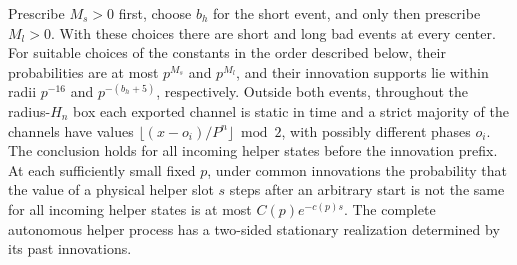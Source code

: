 \begin{lemma}\label{lem:stripes}
Prescribe \(M_s>0\) first, choose \(b_h\) for the short event, and only then prescribe \(M_l>0\). With these choices there are short and long bad events at every center. For suitable choices of the constants in the order described below, their probabilities are at most \(p^{M_s}\) and \(p^{M_l}\), and their innovation supports lie within radii \(p^{-16}\) and \(p^{-(b_h+5)}\), respectively. Outside both events, throughout the radius-\(H_n\) box each exported channel is static in time and a strict majority of the channels have values \(\lfloor(x-o_i)/P^n\rfloor\bmod2\), with possibly different phases \(o_i\). The conclusion holds for all incoming helper states before the innovation prefix. At each sufficiently small fixed \(p\), under common innovations the probability that the value of a physical helper slot \(s\) steps after an arbitrary start is not the same for all incoming helper states is at most \(C(p)e^{-c(p)s}\). The complete autonomous helper process has a two-sided stationary realization determined by its past innovations.
\end{lemma}

